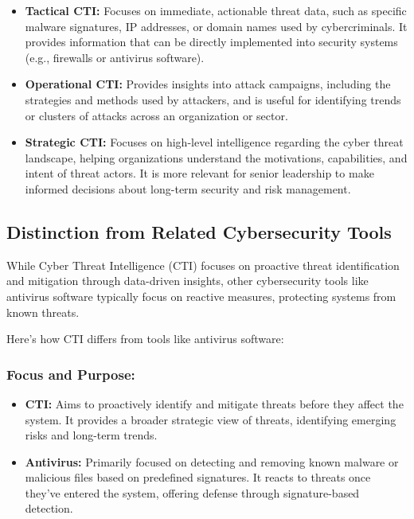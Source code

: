 \documentclass[a4paper,twoside,12pt]{report}
\begin{document}
\begin{itemize}
    \item \textbf{Tactical CTI:} Focuses on immediate, actionable threat data, such as specific malware signatures, IP addresses, or domain names used by cybercriminals. It provides information that can be directly implemented into security systems (e.g., firewalls or antivirus software).
    
    \item \textbf{Operational CTI:} Provides insights into attack campaigns, including the strategies and methods used by attackers, and is useful for identifying trends or clusters of attacks across an organization or sector.
    
    \item \textbf{Strategic CTI:} Focuses on high-level intelligence regarding the cyber threat landscape, helping organizations understand the motivations, capabilities, and intent of threat actors. It is more relevant for senior leadership to make informed decisions about long-term security and risk management.
\end{itemize}

\subsection{Distinction from Related Cybersecurity Tools}

While Cyber Threat Intelligence (CTI) focuses on proactive threat identification and mitigation through data-driven insights, other cybersecurity tools like antivirus software typically focus on reactive measures, protecting systems from known threats.

Here’s how CTI differs from tools like antivirus software:

\subsubsection{Focus and Purpose:}
\begin{itemize}
    \item \textbf{CTI:} Aims to proactively identify and mitigate threats before they affect the system. It provides a broader strategic view of threats, identifying emerging risks and long-term trends.
    
    \item \textbf{Antivirus:} Primarily focused on detecting and removing known malware or malicious files based on predefined signatures. It reacts to threats once they’ve entered the system, offering defense through signature-based detection.
\end{itemize}
\end{document}
